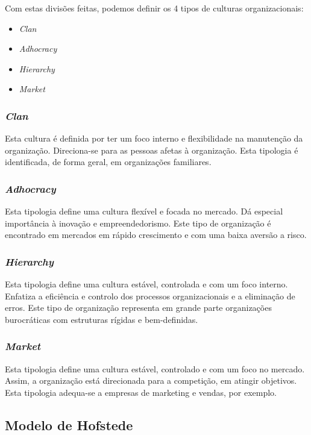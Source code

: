 Com estas divisões feitas, podemos definir os 4 tipos de culturas organizacionais:

\begin{itemize}
	\item \textit{Clan}
	\item \textit{Adhocracy}
	\item \textit{Hierarchy}
	\item \textit{Market}
\end{itemize}

\subsubsection{\textit{Clan}}

Esta cultura é definida por ter um foco interno e flexibilidade na manutenção da organização. Direciona-se para as pessoas afetas à organização. Esta tipologia é identificada, de forma geral, em organizações familiares.


\subsubsection{\textit{Adhocracy}}

Esta tipologia define uma cultura flexível e focada no mercado. Dá especial importância à inovação e empreendedorismo. Este tipo de organização é encontrado em mercados em rápido crescimento e com uma baixa aversão a risco.

\subsubsection{\textit{Hierarchy}}

Esta tipologia define uma cultura estável, controlada e com um foco interno. Enfatiza a eficiência e controlo dos processos organizacionais e a eliminação de erros. Este tipo de organização representa em grande parte organizações burocráticas com estruturas rígidas e bem-definidas.

\subsubsection{\textit{Market}}

Esta tipologia define uma cultura estável, controlado e com um foco no mercado. Assim, a organização está direcionada para a competição, em atingir objetivos. Esta tipologia adequa-se a empresas de marketing e vendas, por exemplo.

\subsection{Modelo de Hofstede}

